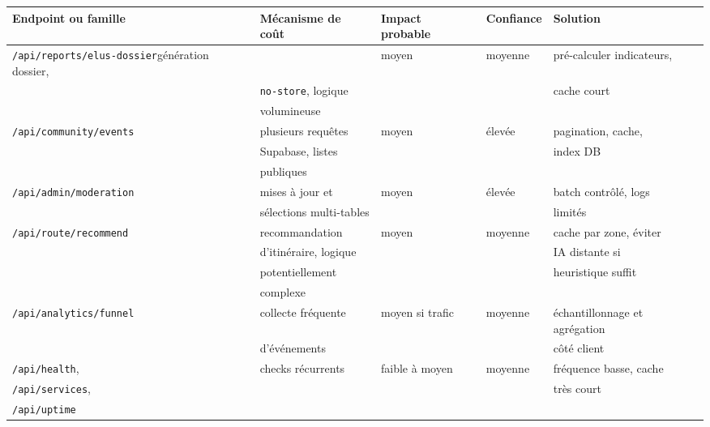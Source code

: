 \documentclass[
  10pt,
  a4paper,
  DIV=11,
  numbers=noendperiod,
  oneside]{scrreprt}
\newcounter{none} %
\begin{document}
{\def\LTcaptype{none} %
\begin{longtable}[]{@{}
  >{\raggedright\arraybackslash}p{}
  >{\raggedright\arraybackslash}p{}
  >{\raggedright\arraybackslash}p{}
  >{\raggedright\arraybackslash}p{}
  >{\raggedright\arraybackslash}p{}@{}}
\toprule\noalign{}
\begin{minipage}[b]{\linewidth}\raggedright
Endpoint ou famille
\end{minipage} & \begin{minipage}[b]{\linewidth}\raggedright
Mécanisme de coût
\end{minipage} & \begin{minipage}[b]{\linewidth}\raggedright
Impact probable
\end{minipage} & \begin{minipage}[b]{\linewidth}\raggedright
Confiance
\end{minipage} & \begin{minipage}[b]{\linewidth}\raggedright
Solution
\end{minipage} \\
\midrule\noalign{}
\endhead
\bottomrule\noalign{}
\endlastfoot
\texttt{/api/reports/elus-dossier}génération dossier, & & moyen &
moyenne & pré-calculer indicateurs, \\
& \texttt{no-store}, logique & & & cache court \\
& volumineuse & & & \\
\texttt{/api/community/events} & plusieurs requêtes & moyen & élevée &
pagination, cache, \\
& Supabase, listes & & & index DB \\
& publiques & & & \\
\texttt{/api/admin/moderation} & mises à jour et & moyen & élevée &
batch contrôlé, logs \\
& sélections multi-tables & & & limités \\
\texttt{/api/route/recommend} & recommandation & moyen & moyenne & cache
par zone, éviter \\
& d'itinéraire, logique & & & IA distante si \\
& potentiellement & & & heuristique suffit \\
& complexe & & & \\
\texttt{/api/analytics/funnel} & collecte fréquente & moyen si trafic &
moyenne & échantillonnage et agrégation \\
& d'événements & & & côté client \\
\texttt{/api/health}, & checks récurrents & faible à moyen & moyenne &
fréquence basse, cache \\
\texttt{/api/services}, & & & & très court \\
\texttt{/api/uptime} & & & & \\
\end{longtable}
}
\end{document}
